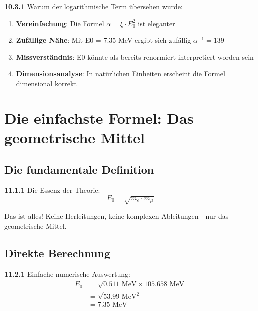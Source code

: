 \begin{tcolorbox}[colback=yellow!5!white,colframe=orange!75!black,title=Mögliche Gründe]
	\noindent \textbf{10.3.1} Warum der logarithmische Term übersehen wurde:
	\begin{enumerate}
		\item \textbf{Vereinfachung}: Die Formel $\alpha = \xi \cdot E_0^2$ ist eleganter
		\item \textbf{Zufällige Nähe}: Mit E0 = 7.35 MeV ergibt sich zufällig $\alpha^{-1} = 139$
		\item \textbf{Missverständnis}: E0 könnte als bereits renormiert interpretiert worden sein
		\item \textbf{Dimensionsanalyse}: In natürlichen Einheiten erscheint die Formel dimensional korrekt
	\end{enumerate}
\end{tcolorbox}

\section{Die einfachste Formel: Das geometrische Mittel}

\subsection{Die fundamentale Definition}

\begin{tcolorbox}[colback=yellow!10!white,colframe=red!75!black,title=\textbf{DIE EINFACHSTE FORMEL}]
	\noindent \textbf{11.1.1} Die Essenz der Theorie:
	\begin{equation}
		\boxed{E_0 = \sqrt{m_e \cdot m_\mu}}
	\end{equation}
	
	Das ist alles! Keine Herleitungen, keine komplexen Ableitungen - nur das geometrische Mittel.
\end{tcolorbox}

\subsection{Direkte Berechnung}

\noindent \textbf{11.2.1} Einfache numerische Auswertung:
\begin{align}
	E_0 &= \sqrt{0.511 \text{ MeV} \times 105.658 \text{ MeV}} \\
	&= \sqrt{53.99 \text{ MeV}^2} \\
	&= 7.35 \text{ MeV}
\end{align}

